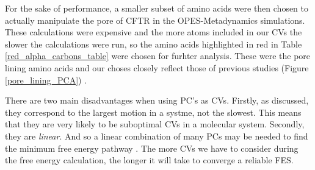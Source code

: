 For the sake of performance, a smaller subset of amino acids were then chosen to actually manipulate the pore of CFTR in the OPES-Metadynamics simulations. These calculations were expensive and the more atoms included in our CVs the slower the calculations were run, so the amino acids highlighted in red in Table \ref{red_alpha_carbons_table} were chosen for furhter analysis. These were the pore lining amino acids and our choses closely reflect those of previous studies (Figure \ref{pore_lining_PCA}) \cite{hoffman2018}. 

There are two main disadvantages when using PC's as CVs. Firstly, as discussed, they correspond to the largest motion in a systme, not the slowest. This means that they are very likely to be suboptimal CVs in a molecular system. Secondly, they are \textit{linear}. And so a linear combination of many PCs  may be needed to find the minimum free energy pathway \cite{}. The more CVs we have to consider during the free energy calculation, the longer it will take to converge a reliable FES.

